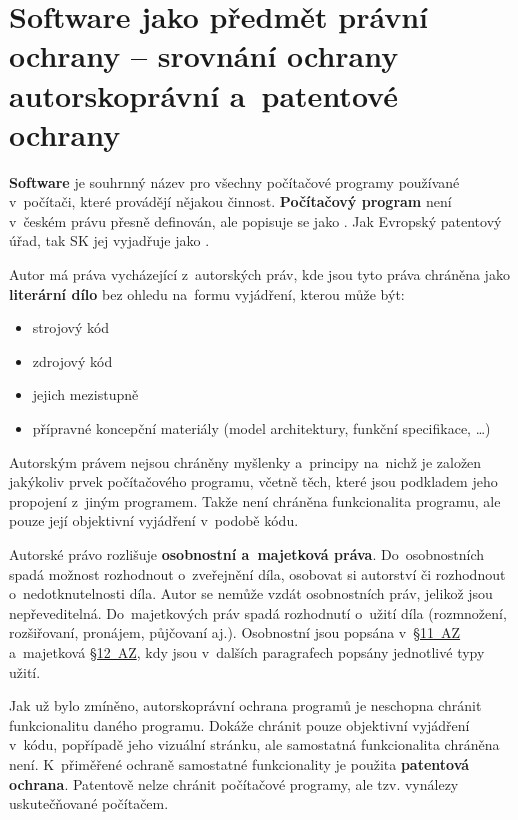 \section{Software jako předmět právní ochrany -- srovnání ochrany autorskoprávní a~patentové ochrany}

\textbf{Software} je souhrnný název pro všechny počítačové programy používané v~počítači, které provádějí nějakou činnost. \textbf{Počítačový program} není v~českém právu přesně definován, ale popisuje se jako .
Jak Evropský patentový úřad, tak SK jej vyjadřuje jako \emph{}.

Autor má práva vycházející z~autorských práv, kde jsou tyto práva chráněna jako \textbf{literární dílo} bez ohledu na~formu vyjádření, kterou může být:

\begin{itemize}
	\item strojový kód
	\item zdrojový kód
	\item jejich mezistupně
	\item přípravné koncepční materiály (model architektury, funkční specifikace, \dots)
\end{itemize}

Autorským právem nejsou chráněny myšlenky a~principy na~nichž je založen jakýkoliv prvek počítačového programu, včetně těch, které jsou podkladem jeho propojení z~jiným programem. Takže není chráněna funkcionalita programu, ale pouze její objektivní vyjádření v~podobě kódu.

Autorské právo rozlišuje \textbf{osobnostní a~majetková práva}. Do~osobnostních spadá možnost rozhodnout o~zveřejnění díla, osobovat si autorství či rozhodnout o~nedotknutelnosti díla. Autor se nemůže vzdát osobnostních práv, jelikož jsou nepřeveditelná. Do~majetkových práv spadá rozhodnutí o~užití díla (rozmnožení, rozšiřovaní, pronájem, půjčovaní aj.). Osobnostní jsou popsána v~\href{https://www.zakonyprolidi.cz/cs/2000-121#p11}{§11~AZ} a~majetková \href{https://www.zakonyprolidi.cz/cs/2000-121#p12}{§12~AZ}, kdy jsou v~dalších paragrafech popsány jednotlivé typy užití.

Jak už bylo zmíněno, autorskoprávní ochrana programů je neschopna chránit funkcionalitu daného programu. Dokáže chránit pouze objektivní vyjádření v~kódu, popřípadě jeho vizuální stránku, ale samostatná funkcionalita chráněna není. K~přiměřené ochraně samostatné funkcionality je použita \textbf{patentová ochrana}. Patentově nelze chránit počítačové programy, ale tzv. vynálezy uskutečňované počítačem.

